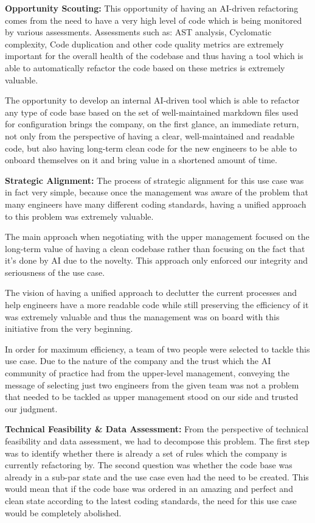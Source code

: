 \documentclass[]{imc-inf}
\begin{document}
\textbf{Opportunity Scouting:}
This opportunity of having an AI-driven refactoring comes from the need to have a very high level of code which is being monitored by various assessments. Assessments such as: AST analysis, Cyclomatic complexity, Code duplication and other code quality metrics are extremely important for the overall health of the codebase and thus having a tool which is able to automatically refactor the code based on these metrics is extremely valuable.

The opportunity to develop an internal AI-driven tool which is able to refactor any type of code base based on the set of well-maintained markdown files used for configuration brings the company, on the first glance, an immediate return, not only from the perspective of having a clear, well-maintained and readable code, but also having long-term clean code for the new engineers to be able to onboard themselves on it and bring value in a shortened amount of time.

\textbf{Strategic Alignment:} 
The process of strategic alignment for this use case was in fact very simple, because once the management was aware of the problem that many engineers have many different coding standards, having a unified approach to this problem was extremely valuable. 

The main approach when negotiating with the upper management focused on the long-term value of having a clean codebase rather than focusing on the fact that it's done by AI due to the novelty. This approach only enforced our integrity and seriousness of the use case.

The vision of having a unified approach to declutter the current processes and help engineers have a more readable code while still preserving the efficiency of it was extremely valuable and thus the management was on board with this initiative from the very beginning.

In order for maximum efficiency, a team of two people were selected to tackle this use case. Due to the nature of the company and the trust which the AI community of practice had from the upper-level management, conveying the message of selecting just two engineers from the given team was not a problem that needed to be tackled as upper management stood on our side and trusted our judgment.

\textbf{Technical Feasibility \& Data Assessment:}
From the perspective of technical feasibility and data assessment, we had to decompose this problem. 
The first step was to identify whether there is already a set of rules which the company is currently refactoring by. The second question was whether the code base was already in a sub-par state and the use case even had the need to be created. This would mean that if the code base was ordered in an amazing and perfect and clean state according to the latest coding standards, the need for this use case would be completely abolished. 
\end{document}
